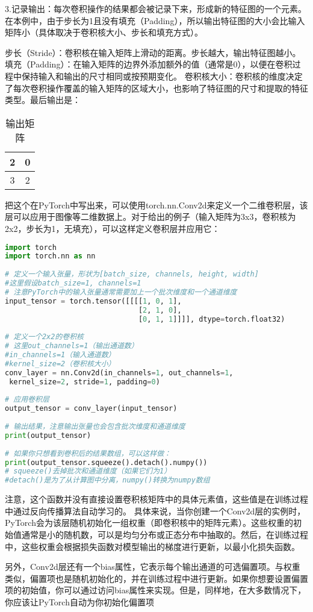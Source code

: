 3.记录输出：每次卷积操作的结果都会被记录下来，形成新的特征图的一个元素。在本例中，由于步长为1且没有填充（Padding），所以输出特征图的大小会比输入矩阵小（具体取决于卷积核大小、步长和填充方式）。

步长（Stride）：卷积核在输入矩阵上滑动的距离。步长越大，输出特征图越小。
填充（Padding）：在输入矩阵的边界外添加额外的值（通常是0），以便在卷积过程中保持输入和输出的尺寸相同或按预期变化。
卷积核大小：卷积核的维度决定了每次卷积操作覆盖的输入矩阵的区域大小，也影响了特征图的尺寸和提取的特征类型。
​
最后输出是：\begin{table}[ht]
\centering
\caption{输出矩阵}\label{tab_CNN24}
\begin{tabular}{|c|c|}
\hline
2 & 0 \\
\hline
3 & 2 \\
\hline
\end{tabular}
\end{table}

把这个在PyTorch中写出来，可以使用torch.nn.Conv2d来定义一个二维卷积层，该层可以应用于图像等二维数据上。对于给出的例子（输入矩阵为3x3，卷积核为2x2，步长为1，无填充），可以这样定义卷积层并应用它：


\begin{lstlisting}[language=python]
import torch  
import torch.nn as nn  
  
# 定义一个输入张量，形状为[batch_size, channels, height, width]
#这里假设batch_size=1, channels=1  
# 注意PyTorch中的输入张量通常需要加上一个批次维度和一个通道维度  
input_tensor = torch.tensor([[[[1, 0, 1],  
                               [2, 1, 0],  
                               [0, 1, 1]]]], dtype=torch.float32)  
  
# 定义一个2x2的卷积核
# 这里out_channels=1（输出通道数）
#in_channels=1（输入通道数）
#kernel_size=2（卷积核大小）  
conv_layer = nn.Conv2d(in_channels=1, out_channels=1,
 kernel_size=2, stride=1, padding=0)  
  
# 应用卷积层  
output_tensor = conv_layer(input_tensor)  
  
# 输出结果，注意输出张量也会包含批次维度和通道维度  
print(output_tensor)  
  
# 如果你只想看到卷积后的结果数组，可以这样做：  
print(output_tensor.squeeze().detach().numpy())  
# squeeze()去掉批次和通道维度（如果它们为1）
#detach()是为了从计算图中分离，numpy()转换为numpy数组
\end{lstlisting}

注意，这个函数并没有直接设置卷积核矩阵中的具体元素值，这些值是在训练过程中通过反向传播算法自动学习的。
具体来说，当你创建一个Conv2d层的实例时，PyTorch会为该层随机初始化一组权重（即卷积核中的矩阵元素）。这些权重的初始值通常是小的随机数，可以是均匀分布或正态分布中抽取的。然后，在训练过程中，这些权重会根据损失函数对模型输出的梯度进行更新，以最小化损失函数。

另外，Conv2d层还有一个bias属性，它表示每个输出通道的可选偏置项。与权重类似，偏置项也是随机初始化的，并在训练过程中进行更新。如果你想要设置偏置项的初始值，你可以通过访问bias属性来实现。但是，同样地，在大多数情况下，你应该让PyTorch自动为你初始化偏置项